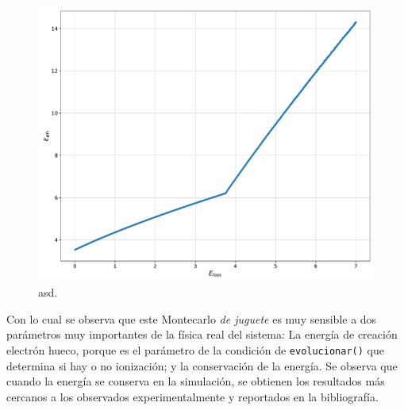 \begin{figure}[h]
    \centering
    \includegraphics[scale=0.35]{Figs/E_eh_vs_Eloss_5ktrials_0-7Eloss.pdf}
    \caption{\footnotesize{asd.}}
    \label{fig:CreacionHuecoVsEloss}
\end{figure}
Con lo cual se observa que este Montecarlo \textit{de juguete} es muy sensible a dos parámetros muy importantes de la física real del sistema: La energía de creación electrón hueco, porque es el parámetro de la condición de \verb|evolucionar()| que determina si hay o no ionización; y la conservación de la energía. Se observa que cuando la energía se conserva en la simulación, se obtienen los resultados más cercanos a los observados experimentalmente y reportados en la bibliografía.